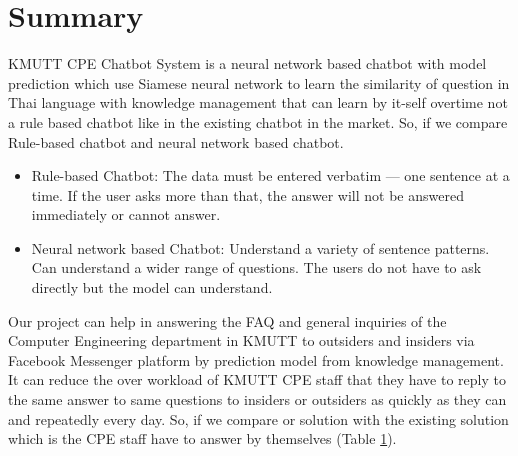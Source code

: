 \documentclass[12pt,oneside,openright,a4paper]{cpe-english-project}
\begin{document}
\section{Summary}
KMUTT CPE Chatbot System is a neural network based chatbot with model prediction which use
Siamese neural network to learn the similarity of question in Thai language with knowledge
management that can learn by it-self overtime not a rule based chatbot like in the existing
chatbot in the market. So, if we compare Rule-based chatbot and neural network based chatbot.
\begin{itemize}
  \item Rule-based Chatbot: The data must be entered verbatim — one sentence at a time. If the
  user asks more than that, the answer will not be answered immediately or cannot answer.
  \item Neural network based Chatbot: Understand a variety of sentence patterns. Can understand
  a wider range of questions. The users do not have to ask directly but the model can understand.
\end{itemize}
Our project can help in answering the FAQ and general inquiries of the Computer Engineering
department in KMUTT to outsiders and insiders via Facebook Messenger platform by prediction
model from knowledge management. It can reduce the over workload of KMUTT CPE staff that they
have to reply to the same answer to same questions to insiders or outsiders as quickly as they
can and repeatedly every day. So, if we compare or solution with the existing solution which is
the CPE staff have to answer by themselves (Table \ref*{table:ch3_solution_compare}).
\begin{figure}[h!]
  \centering
  \label{table:ch3_solution_compare}
\end{figure}
\end{document}
